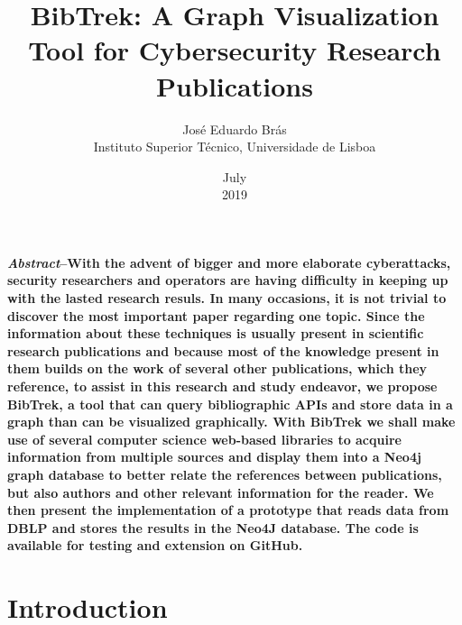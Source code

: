 \documentclass[twocolumn]{article}
\begin{document}
\title{\textbf{BibTrek: A Graph Visualization Tool for Cybersecurity Research Publications}}
\date{}
\author{Jos\'{e} Eduardo Br\'{a}s\\Instituto Superior T\'{e}cnico, Universidade de Lisboa}
\date{July \\2019}
\maketitle

\textbf{\textit{Abstract}--With the advent of bigger and more elaborate cyberattacks, security researchers and operators are having difficulty in keeping up with the lasted research resuls. In many occasions, it is not trivial to discover the most important paper regarding one topic. Since the information about these techniques is usually present in scientific research publications and because most of the knowledge present in them builds on the work of several other publications, which they reference, to assist in this research and study endeavor, we propose BibTrek, a tool that can query bibliographic APIs and store data in a graph than can be visualized graphically. With BibTrek we shall make use of several computer science web-based libraries to acquire information from multiple sources and display them into a Neo4j graph database to better relate the references between publications, but also authors and other relevant information for the reader. We then present the implementation of a prototype that reads data from DBLP and stores the results in the Neo4J database. The code is available for testing and extension on GitHub.}

\section{Introduction}
\end{document}
